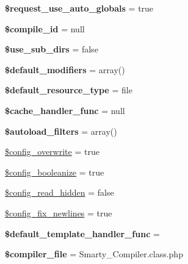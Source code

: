 \begin{DoxyCompactItemize}
{\bfseries \$request\+\_\+use\+\_\+auto\+\_\+globals} = true
\item 
\mbox{\label{class_smarty_aaeefc227178762a06864c31237da2346}} 
{\bfseries \$compile\+\_\+id} = null
\item 
\mbox{\label{class_smarty_a3f4e088a3d57b9fd1954353e89543af9}} 
{\bfseries \$use\+\_\+sub\+\_\+dirs} = false
\item 
\mbox{\label{class_smarty_a12cae6bb768d4ec18d57a40424a63462}} 
{\bfseries \$default\+\_\+modifiers} = array()
\item 
\mbox{\label{class_smarty_a7ee0f162c34279d2d1e3242bbe4c8371}} 
{\bfseries \$default\+\_\+resource\+\_\+type} = \textquotesingle{}file\textquotesingle{}
\item 
\mbox{\label{class_smarty_a6969dcbb5f3323ac34c9e1c6b34b32c6}} 
{\bfseries \$cache\+\_\+handler\+\_\+func} = null
\item 
\mbox{\label{class_smarty_ad553807fd85e84562fc4603744006ce7}} 
{\bfseries \$autoload\+\_\+filters} = array()
\item 
\mbox{\hyperlink{class_smarty_a0b90f939411a8b26f4fd8d1468742366}{\$config\+\_\+overwrite}} = true
\item 
\mbox{\hyperlink{class_smarty_ab1557976e730d7d27918e1db67d33207}{\$config\+\_\+booleanize}} = true
\item 
\mbox{\hyperlink{class_smarty_a0344e29d249821f7fc1b2c92bcaf7adc}{\$config\+\_\+read\+\_\+hidden}} = false
\item 
\mbox{\hyperlink{class_smarty_a7ee5a0cf9d1cb68b82b95f6d3eb47914}{\$config\+\_\+fix\+\_\+newlines}} = true
\item 
\mbox{\label{class_smarty_a23db3edffb65c9be69472854772c7bcc}} 
{\bfseries \$default\+\_\+template\+\_\+handler\+\_\+func} = \textquotesingle{}\textquotesingle{}
\item 
\mbox{\label{class_smarty_a8ff84f18ca467e461c508e9abea90077}} 
{\bfseries \$compiler\+\_\+file} = \textquotesingle{}Smarty\+\_\+\+Compiler.\+class.\+php\textquotesingle{}
\item 
\mbox{\label{class_smarty_a60499e09be682d14ec84fb476199108f}} 

\end{DoxyCompactItemize}
